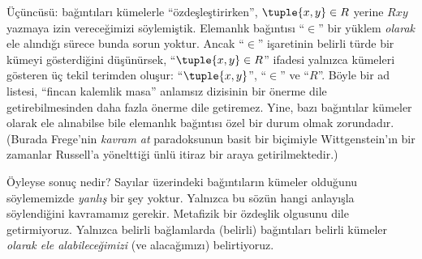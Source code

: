 \documentclass[../../../include/open-logic-section]{subfiles}
\begin{document}
Üçüncüsü: bağıntıları kümelerle ``özdeşleştirirken'', $\tuple{x,y} \in R$
yerine $Rxy$ yazmaya izin vereceğimizi söylemiştik. Elemanlık bağıntısı
``$\in$'' bir yüklem \emph{olarak} ele alındığı sürece bunda sorun yoktur. Ancak
``$\in$'' işaretinin belirli türde bir kümeyi gösterdiğini düşünürsek,
``$\tuple{x,y} \in R$'' ifadesi yalnızca kümeleri gösteren üç tekil terimden
oluşur: ``$\tuple{x,y}$'', ``$\in$'' ve ``$R$''. Böyle bir ad listesi,
``fincan kalemlik masa'' anlamsız dizisinin bir önerme dile getirebilmesinden
daha fazla önerme dile getiremez. Yine, bazı bağıntılar kümeler olarak ele
alınabilse bile elemanlık bağıntısı özel bir durum olmak zorundadır. (Burada
Frege'nin \emph{kavram at} paradoksunun basit bir biçimiyle Wittgenstein'ın bir
zamanlar Russell'a yönelttiği ünlü itiraz bir araya getirilmektedir.)

Öyleyse sonuç nedir? Sayılar üzerindeki bağıntıların kümeler olduğunu
söylememizde \emph{yanlış} bir şey yoktur. Yalnızca bu sözün hangi anlayışla
söylendiğini kavramamız gerekir. Metafizik bir özdeşlik olgusunu dile
getirmiyoruz. Yalnızca belirli bağlamlarda (belirli) bağıntıları belirli kümeler
\emph{olarak ele alabileceğimizi} (ve alacağımızı) belirtiyoruz.
\end{document}
